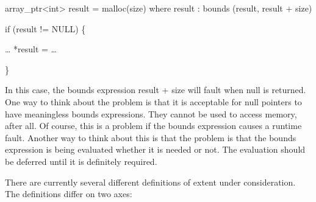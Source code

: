 \documentclass[]{article}
\begin{document}
array\_ptr\textless{}int\textgreater{} result = malloc(size) where
result : bounds (result, result + size)

if (result != NULL) \{

\ldots{} *result = \ldots{}

\}

In this case, the bounds expression result + size will fault when null
is returned. One way to think about the problem is that it is acceptable
for null pointers to have meaningless bounds expressions. They cannot be
used to access memory, after all. Of course, this is a problem if the
bounds expression causes a runtime fault. Another way to think about
this is that the problem is that the bounds expression is being
evaluated whether it is needed or not. The evaluation should be deferred
until it is definitely required.

There are currently several different definitions of extent under
consideration. The definitions differ on two axes:
\end{document}
